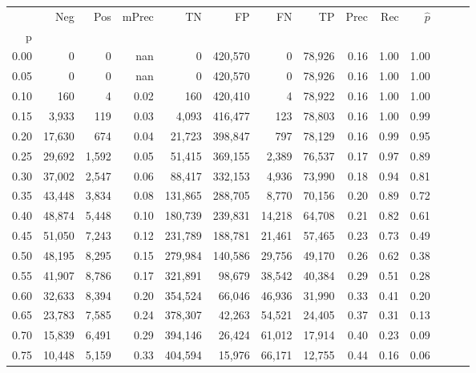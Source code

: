 \begin{tabular}{rrrrrrrrrrrrrr}
\toprule
{} &     Neg &    Pos & mPrec &       TN &       FP &      FN &      TP &  Prec &   Rec & $\hat{p}$ \\
p    &         &        &       &          &          &         &         &       &       &           \\
\midrule
0.00 &       0 &      0 &   nan &        0 &  420,570 &       0 &  78,926 &  0.16 &  1.00 &      1.00 \\
0.05 &       0 &      0 &   nan &        0 &  420,570 &       0 &  78,926 &  0.16 &  1.00 &      1.00 \\
0.10 &     160 &      4 &  0.02 &      160 &  420,410 &       4 &  78,922 &  0.16 &  1.00 &      1.00 \\
0.15 &   3,933 &    119 &  0.03 &    4,093 &  416,477 &     123 &  78,803 &  0.16 &  1.00 &      0.99 \\
0.20 &  17,630 &    674 &  0.04 &   21,723 &  398,847 &     797 &  78,129 &  0.16 &  0.99 &      0.95 \\
0.25 &  29,692 &  1,592 &  0.05 &   51,415 &  369,155 &   2,389 &  76,537 &  0.17 &  0.97 &      0.89 \\
0.30 &  37,002 &  2,547 &  0.06 &   88,417 &  332,153 &   4,936 &  73,990 &  0.18 &  0.94 &      0.81 \\
0.35 &  43,448 &  3,834 &  0.08 &  131,865 &  288,705 &   8,770 &  70,156 &  0.20 &  0.89 &      0.72 \\
0.40 &  48,874 &  5,448 &  0.10 &  180,739 &  239,831 &  14,218 &  64,708 &  0.21 &  0.82 &      0.61 \\
0.45 &  51,050 &  7,243 &  0.12 &  231,789 &  188,781 &  21,461 &  57,465 &  0.23 &  0.73 &      0.49 \\
0.50 &  48,195 &  8,295 &  0.15 &  279,984 &  140,586 &  29,756 &  49,170 &  0.26 &  0.62 &      0.38 \\
0.55 &  41,907 &  8,786 &  0.17 &  321,891 &   98,679 &  38,542 &  40,384 &  0.29 &  0.51 &      0.28 \\
0.60 &  32,633 &  8,394 &  0.20 &  354,524 &   66,046 &  46,936 &  31,990 &  0.33 &  0.41 &      0.20 \\
0.65 &  23,783 &  7,585 &  0.24 &  378,307 &   42,263 &  54,521 &  24,405 &  0.37 &  0.31 &      0.13 \\
0.70 &  15,839 &  6,491 &  0.29 &  394,146 &   26,424 &  61,012 &  17,914 &  0.40 &  0.23 &      0.09 \\
0.75 &  10,448 &  5,159 &  0.33 &  404,594 &   15,976 &  66,171 &  12,755 &  0.44 &  0.16 &      0.06 \\

\end{tabular}
